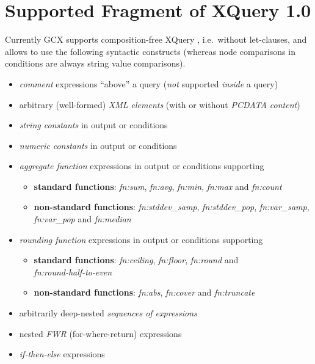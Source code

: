 \section{Supported Fragment of XQuery 1.0}
Currently GCX supports composition-free XQuery \cite{bibitem:koch12005}, i.e.~without let-clauses, and allows to use the following syntactic constructs (whereas node comparisons in conditions are always string value comparisons).
\begin{itemize}
  \setlength{\itemsep}{0pt}
  \item[\textbullet] \emph{comment} expressions \enquote{above} a query (\emph{not} supported \emph{inside} a query)
  \item[\textbullet] arbitrary (well-formed) \emph{XML elements} (with or without \emph{PCDATA content})
  \item[\textbullet] \emph{string constants} in output or conditions
  \item[\textbullet] \emph{numeric constants} in output or conditions
  \item[\textbullet] \emph{aggregate function} expressions in output or conditions supporting
  \begin{itemize}
    \setlength{\itemsep}{0pt}
    \item[\textbullet] \textbf{standard functions}: \emph{fn:sum}, \emph{fn:avg}, \emph{fn:min}, \emph{fn:max} and \emph{fn:count}
    \item[\textbullet] \textbf{non-standard functions}: \emph{fn:stddev\_samp}, \emph{fn:stddev\_pop}, \emph{fn:var\_samp}, \emph{fn:var\_pop} and \emph{fn:median}
  \end{itemize}
  \item[\textbullet] \emph{rounding function} expressions in output or conditions supporting
  \begin{itemize}
    \setlength{\itemsep}{0pt}
    \item[\textbullet] \textbf{standard functions}: \emph{fn:ceiling}, \emph{fn:floor}, \emph{fn:round} and \\ \emph{fn:round-half-to-even}
    \item[\textbullet] \textbf{non-standard functions}: \emph{fn:abs}, \emph{fn:cover} and \emph{fn:truncate}
  \end{itemize}
  \item[\textbullet] arbitrarily deep-nested \emph{sequences of expressions}
  \item[\textbullet] nested \emph{FWR} (for-where-return) expressions
  \item[\textbullet] \emph{if-then-else} expressions

\end{itemize}
